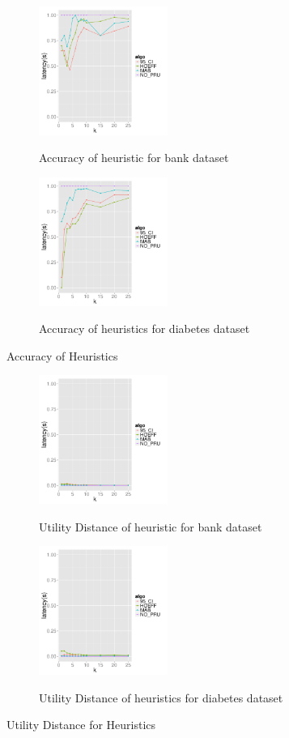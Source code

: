 \begin{figure}[h]
\centering
\begin{subfigure}{0.49\linewidth}
\centering
{\includegraphics[width=4.2cm] {Images/bank_in_memory_accuracy.pdf}}
\caption{Accuracy of heuristic for bank dataset}
\label{fig:bank_accuracy}
\end{subfigure}
\begin{subfigure}{0.49\linewidth}
\centering
{\includegraphics[width=4.2cm] {Images/dia_in_memory_accuracy.pdf}}
\caption{Accuracy of heuristics for diabetes dataset}
\label{fig:dia_accuracy}
\end{subfigure}
\label{fig:accuracy}
\caption{Accuracy of Heuristics}
\end{figure}


\begin{figure}[h]
\centering
\begin{subfigure}{0.49\linewidth}
\centering
{\includegraphics[width=4.2cm] {Images/bank_in_memory_utility_dist.pdf}}
\caption{Utility Distance of heuristic for bank dataset}
\label{fig:bank_utility_dist}
\end{subfigure}
\begin{subfigure}{0.49\linewidth}
\centering
{\includegraphics[width=4.2cm] {Images/dia_in_memory_utility_dist.pdf}}
\caption{Utility Distance of heuristics for diabetes dataset}
\label{fig:dia_utility_dist}
\end{subfigure}
\label{fig:accuracy}
\caption{Utility Distance for Heuristics}
\end{figure}

